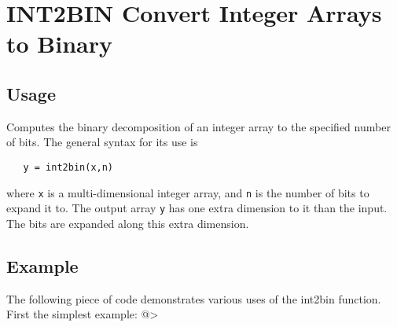 \section{INT2BIN Convert Integer Arrays to Binary}

\subsection{Usage}

Computes the binary decomposition of an integer array to the specified
number of bits.  The general syntax for its use is
\begin{verbatim}
   y = int2bin(x,n)
\end{verbatim}
where \verb|x| is a multi-dimensional integer array, and \verb|n| is the number
of bits to expand it to.  The output array \verb|y| has one extra dimension
to it than the input.  The bits are expanded along this extra dimension.
\subsection{Example}

The following piece of code demonstrates various uses of the int2bin
function.  First the simplest example:
@>
